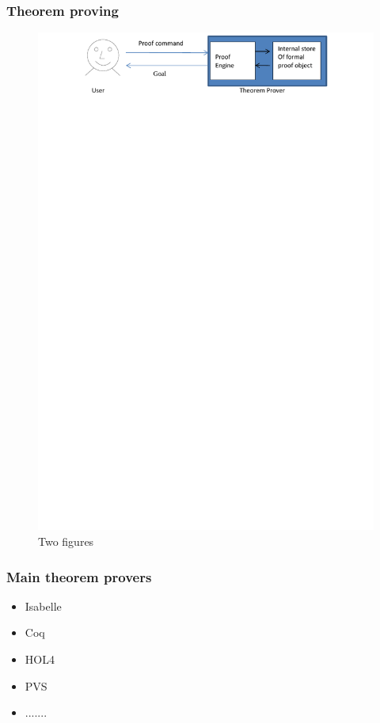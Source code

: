 \documentclass{beamer}
\begin{document}
\begin{frame}\frametitle{Theorem proving}
\vspace{2cm}
\begin{figure}[!ht]

\includegraphics[width=1.0\textwidth]{goal.pdf}
 \caption{Two figures}
\label{fig:arch}
\end{figure}

\end{frame}

\begin{frame}\frametitle{Main theorem provers}

\begin{itemize}
\item Isabelle
\item Coq
\item HOL4
\item PVS
\item .......
\end{itemize}
\end{frame}
\end{document}
